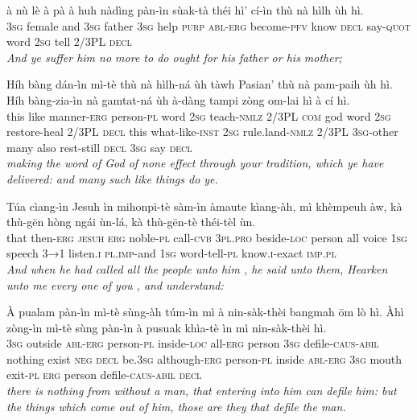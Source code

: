 \documentclass[11pt,a4paper]{article}
\begin{document}
\begin{exe}
\gll à nù lè à pà à huh nàdìng pàn-ìn sùak-tà théi hì' cí-ìn thù nà hìlh ùh hì. \\
     \textsc{3sg} female and \textsc{3sg} father \textsc{3sg} help \textsc{purp} \textsc{abl}-\textsc{erg} become-\textsc{pfv} know \textsc{decl} say-\textsc{quot} word \textsc{2sg} tell 2/3PL \textsc{decl} \\
\glt \textcolor{kjvcolor}{\textit{And ye suffer him no more to do ought for his father or his mother;}}

\gll Híh bàng dán-ìn mì-tè thù nà hìlh-ná ùh tàwh Pasian' thù nà pam-paih ùh hì. Híh bàng-zia-ìn nà gamtat-ná ùh à-dàng tampi zòng om-lai hì à cí hì. \\
     this like manner-\textsc{erg} person-\textsc{pl} word \textsc{2sg} teach-\textsc{nmlz} 2/3PL \textsc{com} god word \textsc{2sg} restore-heal 2/3PL \textsc{decl} this what-like-\textsc{inst} \textsc{2sg} rule.land-\textsc{nmlz} 2/3PL \textsc{3sg}-other many also rest-still \textsc{decl} \textsc{3sg} say \textsc{decl} \\
\glt \textcolor{kjvcolor}{\textit{making the word of God of none effect through your tradition, which ye have delivered: and many such like things do ye.}}

\gll Túa cìang-ìn Jesuh ìn mihonpi-tè sàm-ìn àmaute kìang-àh, mì khèmpeuh àw, kà thù-gēn hòng ngái ùn-lá, kà thù-gēn-tè théi-tèl ùn. \\
     that then-\textsc{erg} \textsc{jesuh} \textsc{erg} noble-\textsc{pl} call-\textsc{cvb} \textsc{3pl}.\textsc{pro} beside-\textsc{loc} person all voice \textsc{1sg} speech \textsc{3→1} listen.\textsc{i} \textsc{pl}.\textsc{imp}-and \textsc{1sg} word-tell-\textsc{pl} know.\textsc{i}-exact \textsc{imp}.\textsc{pl} \\
\glt \textcolor{kjvcolor}{\textit{And when he had called all the people unto him , he said unto them, Hearken unto me every one of you , and understand:}}

\gll À pualam pàn-ìn mì-tè sùng-àh túm-ìn mì à nin-sàk-thèi bangmah ōm lò hì. Àhì zòng-ìn mì-tè sùng pàn-ìn à pusuak khìa-tè ìn mì nin-sàk-thèi hì. \\
     \textsc{3sg} outside \textsc{abl}-\textsc{erg} person-\textsc{pl} inside-\textsc{loc} all-\textsc{erg} person \textsc{3sg} defile-\textsc{caus}-\textsc{abil} nothing exist \textsc{neg} \textsc{decl} be.\textsc{3sg} although-\textsc{erg} person-\textsc{pl} inside \textsc{abl}-\textsc{erg} \textsc{3sg} mouth exit-\textsc{pl} \textsc{erg} person defile-\textsc{caus}-\textsc{abil} \textsc{decl} \\
\glt \textcolor{kjvcolor}{\textit{there is nothing from without a man, that entering into him can defile him: but the things which come out of him, those are they that defile the man.}}


\end{exe}
\end{document}
